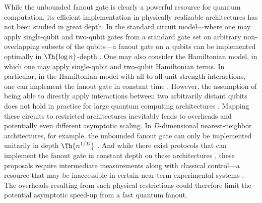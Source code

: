 While the unbounded fanout gate is clearly a powerful resource for quantum computation, its efficient implementation in physically realizable architectures has not been studied in great depth.
In the standard circuit model---where one may apply single-qubit and two-qubit gates from a standard gate set on arbitrary non-overlapping subsets of the qubits---a fanout gate on $n$ qubits can be implemented optimally in $\Th{\log{n}}$-depth \cite{bigO,Broadbent2009a}.
One may also consider the Hamiltonian model, in which one may apply single-qubit and two-qubit Hamiltonian terms.
In particular, in the Hamiltonian model with all-to-all unit-strength interactions, one can implement the fanout gate in constant time \cite{Fenner2003,Fenner2004}.
However, the assumption of being able to directly apply interactions between two arbitrarily distant qubits does not hold in practice for large quantum computing architectures \cite{Monroe2014,Linke2017,Bapat2018,Childs2019c}.
Mapping these circuits to restricted architectures inevitably leads to overheads and potentially even different asymptotic scaling.
In $D$-dimensional nearest-neighbor architectures, for example, the unbounded fanout gate can only be implemented unitarily in depth $\Th{n^{1/D}}$ \cite{Rosenbaum2013}.
And while there exist protocols that can implement the fanout gate in constant depth on these architectures \cite{Pham2013}, these proposals require intermediate measurements along with classical control---a resource that may be inaccessible in certain near-term experimental systems \cite{Arute2019}.
The overheads resulting from such physical restrictions could therefore limit the potential asymptotic speed-up from a fast quantum fanout.

